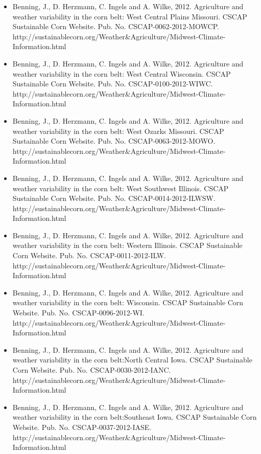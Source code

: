 \begin{itemize}
\item Benning, J., D. Herzmann, C. Ingels and A. Wilke, 2012. Agriculture and weather variability in the corn belt: West Central Plains Missouri. CSCAP Sustainable Corn Website. Pub. No. CSCAP-0062-2012-MOWCP. http://sustainablecorn.org/Weather\&Agriculture/Midwest-Climate-Information.html

\item Benning, J., D. Herzmann, C. Ingels and A. Wilke, 2012. Agriculture and weather variability in the corn belt: West Central Wisconsin. CSCAP Sustainable Corn Website. Pub. No. CSCAP-0100-2012-WIWC. http://sustainablecorn.org/Weather\&Agriculture/Midwest-Climate-Information.html

\item Benning, J., D. Herzmann, C. Ingels and A. Wilke, 2012. Agriculture and weather variability in the corn belt: West Ozarks Missouri. CSCAP Sustainable Corn Website. Pub. No. CSCAP-0063-2012-MOWO. http://sustainablecorn.org/Weather\&Agriculture/Midwest-Climate-Information.html

\item Benning, J., D. Herzmann, C. Ingels and A. Wilke, 2012. Agriculture and weather variability in the corn belt: West Southwest Illinois. CSCAP Sustainable Corn Website. Pub. No. CSCAP-0014-2012-ILWSW. http://sustainablecorn.org/Weather\&Agriculture/Midwest-Climate-Information.html

\item Benning, J., D. Herzmann, C. Ingels and A. Wilke, 2012. Agriculture and weather variability in the corn belt: Western Illinois. CSCAP Sustainable Corn Website. Pub. No. CSCAP-0011-2012-ILW. http://sustainablecorn.org/Weather\&Agriculture/Midwest-Climate-Information.html

\item Benning, J., D. Herzmann, C. Ingels and A. Wilke, 2012. Agriculture and weather variability in the corn belt: Wisconsin. CSCAP Sustainable Corn Website. Pub. No. CSCAP-0096-2012-WI. http://sustainablecorn.org/Weather\&Agriculture/Midwest-Climate-Information.html

\item Benning, J., D. Herzmann, C. Ingels and A. Wilke, 2012. Agriculture and weather variability in the corn belt:North Central Iowa. CSCAP Sustainable Corn Website. Pub. No. CSCAP-0030-2012-IANC. http://sustainablecorn.org/Weather\&Agriculture/Midwest-Climate-Information.html

\item Benning, J., D. Herzmann, C. Ingels and A. Wilke, 2012. Agriculture and weather variability in the corn belt:Southeast Iowa. CSCAP Sustainable Corn Website. Pub. No. CSCAP-0037-2012-IASE. http://sustainablecorn.org/Weather\&Agriculture/Midwest-Climate-Information.html


\end{itemize}

